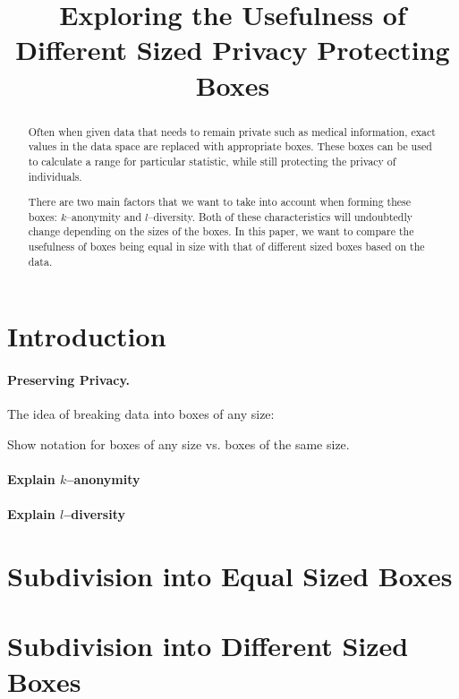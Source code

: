\documentclass{article}
\begin{document}
\title{Exploring the Usefulness of Different Sized Privacy Protecting Boxes}
\author{  }
\date{ }

\begin{abstract}
Often when given data that needs to remain private such as medical information, exact values in the data space are replaced with appropriate boxes. These boxes can be used to calculate a range for particular statistic, while still protecting the privacy of individuals.

There are two main factors that we want to take into account when forming these boxes: $ k $--anonymity and $ l $--diversity. Both of these characteristics will undoubtedly change depending on the sizes of the boxes. In this paper, we want to compare the usefulness of boxes being equal in size with that of different sized boxes based on the data.
\end{abstract}

\section{Introduction}

\paragraph{Preserving Privacy.} The idea of breaking data into boxes of any size:

Show notation for boxes of any size vs. boxes of the same size. 

\paragraph{Explain $ k $--anonymity}

\paragraph{Explain $ l $--diversity}

\paragraph{ }

\section{Subdivision into Equal Sized Boxes}

\section{Subdivision into Different Sized Boxes}
\end{document}
